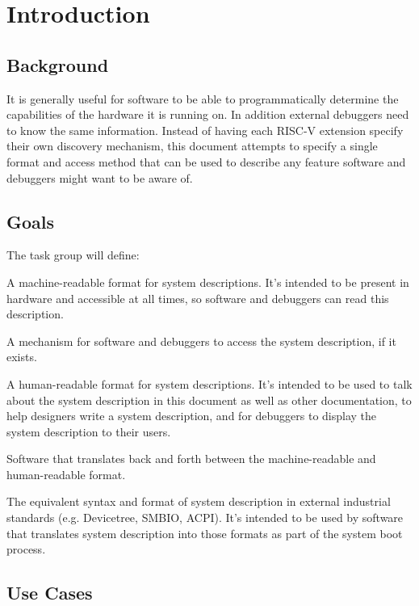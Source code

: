 \chapter{Introduction}

\section{Background}

It is generally useful for software to be able to programmatically determine the
capabilities of the hardware it is running on. In addition external debuggers
need to know the same information. Instead of having each RISC-V extension
specify their own discovery mechanism, this document attempts to specify a
single format and access method that can be used to describe any feature
software and debuggers might want to be aware of.

\section{Goals}

\begin{steps}{The task group will define:}
\item A machine-readable format for system descriptions. It's intended to be
present in hardware and accessible at all times, so software and debuggers
can read this description.
\item A mechanism for software and debuggers to access the system description,
if it exists.
\item A human-readable format for system descriptions. It's intended to be used
to talk about the system description in this document as well as other
documentation, to help designers write a system description, and for debuggers
to display the system description to their users.
\item Software that translates back and forth between the machine-readable and
human-readable format.
\item The equivalent syntax and format of system description in external
industrial standards (e.g. Devicetree, SMBIO, ACPI). It's intended to be used
by software that translates system description into those formats as part of
the system boot process.
\end{steps}

\section{Use Cases}

